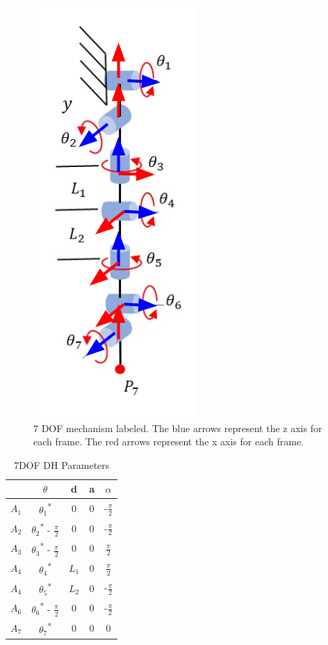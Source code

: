 \documentclass[12pt]{article}
\begin{document}
 \begin{figure}[H]
     \centering
     \includegraphics[width = 0.25\linewidth]{7dof.png}
     \caption{7 DOF mechanism labeled. The blue arrows represent the z axis for each frame. The red arrows represent the x axis for each frame.}
     \label{fig:7dof}
 \end{figure}

\begin{table}[H]
\caption{7DOF DH Parameters}
\begin{center}
\begin{tabular}{ c| c c c c }
 & $\theta$ & d & a & $\alpha$ \\ 
 \hline
 $A_1$ & $\theta_1$\textsuperscript{*} & 0 & 0 & -$\frac{\pi}{2}$ \\  
 $A_2$ & $\theta_2$\textsuperscript{*} - $\frac{\pi}{2}$ & 0 & 0 & -$\frac{\pi}{2}$ \\
 $A_3$ & $\theta_3$\textsuperscript{*} - $\frac{\pi}{2}$ & 0 & 0 & $\frac{\pi}{2}$ \\
 $A_4$ & $\theta_4$\textsuperscript{*} & $L_1$ & 0 & $\frac{\pi}{2}$ \\
 $A_4$ & $\theta_5$\textsuperscript{*} & $L_2$ & 0 & -$\frac{\pi}{2}$ \\
 $A_6$ & $\theta_6$\textsuperscript{*} - $\frac{\pi}{2}$ & 0 & 0 & -$\frac{\pi}{2}$ \\
 $A_7$ & $\theta_7$\textsuperscript{*} & 0 & 0 & 0
\end{tabular}
\end{center}
\end{table}
 
\end{document}
